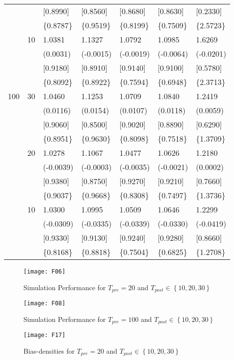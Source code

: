 \begin{table}[H]
{\begin{tabular}{c c | C{2.48cm} | C{2.48cm} | C{2.48cm} | C{2.48cm} | C{2.48cm} }
			&&[0.8990]&[0.8560]&[0.8680]&[0.8630]&[0.2330]\\
			&&\{0.8787\}&\{0.9519\}&\{0.8199\}&\{0.7509\}&\{2.5723\}\\
			&10&1.0381&1.1327&1.0792&1.0985&1.6269\\
			&&(0.0031)&(-0.0015)&(-0.0019)&(-0.0064)&(-0.0201)\\
			&&[0.9180]&[0.8910]&[0.9140]&[0.9100]&[0.5780]\\
			&&\{0.8092\}&\{0.8922\}&\{0.7594\}&\{0.6948\}&\{2.3713\}\\
			\cmidrule(lr){1-7}
			100&30&1.0460&1.1253&1.0709&1.0840&1.2419\\
			&&(0.0116)&(0.0154)&(0.0107)&(0.0118)&(0.0059)\\
			&&[0.9060]&[0.8500]&[0.9020]&[0.8890]&[0.6290]\\
			&&\{0.8951\}&\{0.9630\}&\{0.8098\}&\{0.7518\}&\{1.3709\}\\
			&20&1.0278&1.1067&1.0477&1.0626&1.2180\\
			&&(-0.0039)&(-0.0003)&(-0.0035)&(-0.0021)&(0.0002)\\
			&&[0.9380]&[0.8750]&[0.9270]&[0.9210]&[0.7660]\\
			&&\{0.9037\}&\{0.9668\}&\{0.8308\}&\{0.7497\}&\{1.3736\}\\
			&10&1.0300&1.0995&1.0509&1.0646&1.2299\\
			&&(-0.0309)&(-0.0335)&(-0.0339)&(-0.0330)&(-0.0419)\\
			&&[0.9330]&[0.9130]&[0.9240]&[0.9280]&[0.8660]\\
			&&\{0.8168\}&\{0.8818\}&\{0.7504\}&\{0.6825\}&\{1.2708\}\\
			\bottomrule[1.5pt]
	\end{tabular}}
	\label{table:table S.6}
\end{table}

\begin{figure}[H]
	\centering
	\texttt{[image: F06]}
	\caption{Simulation Performance for $T_{pre} = 20$ and $T_{post} \in \left\lbrace 10,20,30\right\rbrace$}
	\label{F_10}
\end{figure}

\begin{figure}[H]
	\centering
	\texttt{[image: F08]}
	\caption{Simulation Performance for $T_{pre} = 100$ and $T_{post} \in \left\lbrace 10,20,30\right\rbrace$}
	\label{F_11}
\end{figure}

\newpage
\begin{figure}[H]
	\centering
	\texttt{[image: F17]}
	\caption{Bias-densities for $T_{pre} = 20$ and $T_{post} \in \left\lbrace 10,20,30\right\rbrace$}
	\label{F_12}
\end{figure}

